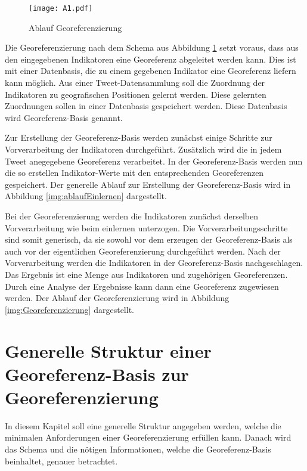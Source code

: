		\begin{figure}[h!]
			\begin{center}
				\texttt{[image: A1.pdf]}
				\caption{Ablauf Georeferenzierung}
				\label{img:georef}
			\end{center}
		\end{figure}	

		Die Georeferenzierung nach dem Schema aus Abbildung \ref{img:georef} setzt voraus, dass aus den eingegebenen Indikatoren eine Georeferenz abgeleitet werden kann.     
		Dies ist mit einer Datenbasis, die zu einem gegebenen Indikator eine Georeferenz liefern kann möglich.
		Aus einer Tweet-Datensammlung soll die Zuordnung der Indikatoren zu geografischen Positionen gelernt werden.
		Diese gelernten Zuordnungen sollen in einer Datenbasis gespeichert werden.
		Diese Datenbasis wird Georeferenz-Basis genannt.
		
		Zur Erstellung der Georeferenz-Basis werden zunächst einige Schritte zur Vorverarbeitung der Indikatoren durchgeführt.
		Zusätzlich wird die in jedem Tweet anegegebene Georeferenz verarbeitet.
		In der Georeferenz-Basis werden nun die so erstellen Indikator-Werte mit den entsprechenden Georeferenzen gespeichert.
		Der generelle Ablauf zur Erstellung der Georeferenz-Basis wird in Abbildung \ref{img:ablaufEinlernen} dargestellt.

		Bei der Georeferenzierung werden die Indikatoren zunächst derselben Vorverarbeitung wie beim einlernen unterzogen.
		Die Vorverarbeitungsschritte sind somit generisch, da sie sowohl vor dem erzeugen der Georeferenz-Basis als auch vor der eigentlichen Georeferenzierung durchgeführt werden.
		Nach der Vorverarbeitung werden die Indikatoren in der Georeferenz-Basis nachgeschlagen.
		Das Ergebnis ist eine Menge aus Indikatoren und zugehörigen Georeferenzen. 
		Durch eine Analyse der Ergebnisse kann dann eine Georeferenz zugewiesen werden.
		Der Ablauf der Georeferenzierung wird in Abbildung \ref{img:Georeferenzierung} dargestellt. 

 

	\section{Generelle Struktur einer Georeferenz-Basis zur Georeferenzierung} \label{sec:generelleStruktur} 

		In diesem Kapitel soll eine generelle Struktur angegeben werden, welche die minimalen Anforderungen einer Georeferenzierung erfüllen kann.
		Danach wird das Schema und die nötigen Informationen, welche die Georeferenz-Basis beinhaltet, genauer betrachtet.
		
